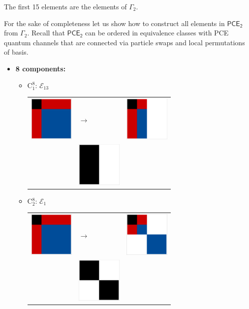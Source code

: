 \documentclass[11pt,dvipsnames]{article} %
\newcommand{\E}{\mathcal{E}}
\newcommand{\1}{\mathds{1}}
\newcommand{\PCE}[1]{\mathsf{PCE}_\mathsf{#1}}
\begin{document}
The first 15 elements are the elements of $\Gamma_2$. 

For the sake
of completeness let us show how to construct all elements in $\PCE{2}$
from $\Gamma_2$. Recall that $\PCE{2}$ can be ordered in 
equivalence classes with PCE quantum channels that are 
connected via particle swaps and local permutations 
of basis.

\begin{itemize}
\item \textbf{8 components:} 
\begin{itemize}
\item C$_1^8$: $\E_{13}$\newline
\begin{tabular}{m{2cm} m{2cm} m{2cm}}
\includegraphics[width=2.2cm]{img-JA/id}  
& \hspace{0.8cm}$\longrightarrow$ 
& \includegraphics[width=2.2cm]{C81} \\ 
 & \includegraphics[width=2.2cm]{ruleC81} & 
\end{tabular} 

\item C$_2^8$: $\E_1$\newline
\begin{tabular}{m{2cm} m{2cm} m{2cm}}
\includegraphics[width=2.2cm]{img-JA/id}  
& \hspace{0.8cm}$\longrightarrow$ 
& \includegraphics[width=2.2cm]{img-JA/8comp}\\ 
 & \includegraphics[width=2.2cm]{img-JA/16To8} &  
\end{tabular} 
\end{itemize}


\end{itemize}
\end{document}
